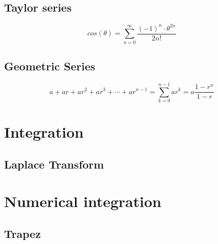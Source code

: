 \subsection{Taylor series}
\begin{equation}
cos(\theta) = \sum_{n=0}^{\infty} \frac{(-1)^n \cdot \theta^{2n}}{2n!}
\end{equation}

\subsection{Geometric Series}
\begin{equation}
a + ar + ar^2 + ar^3 + \cdots + ar^{n-1} = \sum_{k=0}^{n-1}ar^k = a \frac{1-r^n}{1-r}
\end{equation}


\section{Integration}

\subsection{Laplace Transform}

\section{Numerical integration}

\subsection{Trapez}
